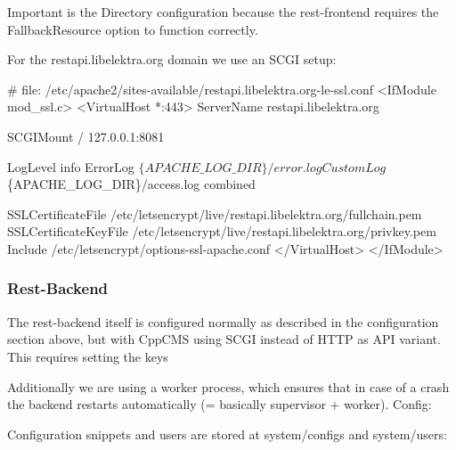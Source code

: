 Important is the {\ttfamily Directory} configuration because the {\ttfamily rest-\/frontend} requires the {\ttfamily Fallback\+Resource} option to function correctly.

For the {\ttfamily restapi.\+libelektra.\+org} domain we use an S\+C\+GI setup\+:


\begin{DoxyCode}
# file: /etc/apache2/sites-available/restapi.libelektra.org-le-ssl.conf
<IfModule mod\_ssl.c>
<VirtualHost *:443>
    ServerName restapi.libelektra.org

    SCGIMount / 127.0.0.1:8081

    LogLevel info
        ErrorLog $\{APACHE\_LOG\_DIR\}/error.log
        CustomLog $\{APACHE\_LOG\_DIR\}/access.log combined

    SSLCertificateFile /etc/letsencrypt/live/restapi.libelektra.org/fullchain.pem
    SSLCertificateKeyFile /etc/letsencrypt/live/restapi.libelektra.org/privkey.pem
    Include /etc/letsencrypt/options-ssl-apache.conf
</VirtualHost>
</IfModule>
\end{DoxyCode}


\subsubsection*{Rest-\/\+Backend}

The {\ttfamily rest-\/backend} itself is configured normally as described in the configuration section above, but with Cpp\+C\+MS using S\+C\+GI instead of H\+T\+TP as A\+PI variant. This requires setting the keys




Additionally we are using a worker process, which ensures that in case of a crash the backend restarts automatically (= basically supervisor + worker). Config\+:




Configuration snippets and users are stored at {\ttfamily system/configs} and {\ttfamily system/users}\+:


